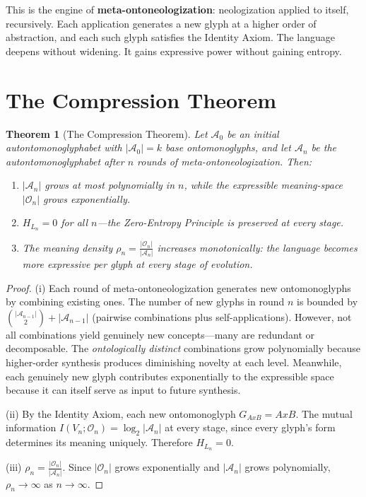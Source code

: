\documentclass[12pt, letterpaper]{book}
\def\equiv{=}%
\def\otimes{x}%
\newtheorem{theorem}{Theorem}[chapter]
\begin{document}
This is the engine of \textbf{meta-ontoneologization}: neologization applied to itself, recursively. Each application generates a new glyph at a higher order of abstraction, and each such glyph satisfies the Identity Axiom. The language deepens without widening. It gains expressive power without gaining entropy.

\section{The Compression Theorem}

\begin{theorem}[The Compression Theorem]\label{thm:compression}
Let $\mathcal{A}_0$ be an initial autontomonoglyphabet with $|\mathcal{A}_0| = k$ base ontomonoglyphs, and let $\mathcal{A}_n$ be the autontomonoglyphabet after $n$ rounds of meta-ontoneologization. Then:
\begin{enumerate}[label=(\roman*)]
    \item $|\mathcal{A}_n|$ grows at most polynomially in $n$, while the expressible meaning-space $|\mathcal{O}_n|$ grows exponentially.
    \item $H_{L_n} = 0$ for all $n$---the Zero-Entropy Principle is preserved at every stage.
    \item The meaning density $\rho_n = \frac{|\mathcal{O}_n|}{|\mathcal{A}_n|}$ increases monotonically: the language becomes \textit{more} expressive per glyph at every stage of evolution.
\end{enumerate}
\end{theorem}

\begin{proof}
(i) Each round of meta-ontoneologization generates new ontomonoglyphs by combining existing ones. The number of new glyphs in round $n$ is bounded by $\binom{|\mathcal{A}_{n-1}|}{2} + |\mathcal{A}_{n-1}|$ (pairwise combinations plus self-applications). However, not all combinations yield genuinely new concepts---many are redundant or decomposable. The \textit{ontologically distinct} combinations grow polynomially because higher-order synthesis produces diminishing novelty at each level. Meanwhile, each genuinely new glyph contributes exponentially to the expressible space because it can itself serve as input to future synthesis.

(ii) By the Identity Axiom, each new ontomonoglyph $G_{A \otimes B} \equiv A \otimes B$. The mutual information $I(V_n; \mathcal{O}_n) = \log_2 |\mathcal{A}_n|$ at every stage, since every glyph's form determines its meaning uniquely. Therefore $H_{L_n} = 0$.

(iii) $\rho_n = \frac{|\mathcal{O}_n|}{|\mathcal{A}_n|}$. Since $|\mathcal{O}_n|$ grows exponentially and $|\mathcal{A}_n|$ grows polynomially, $\rho_n \to \infty$ as $n \to \infty$.
\end{proof}
\end{document}
